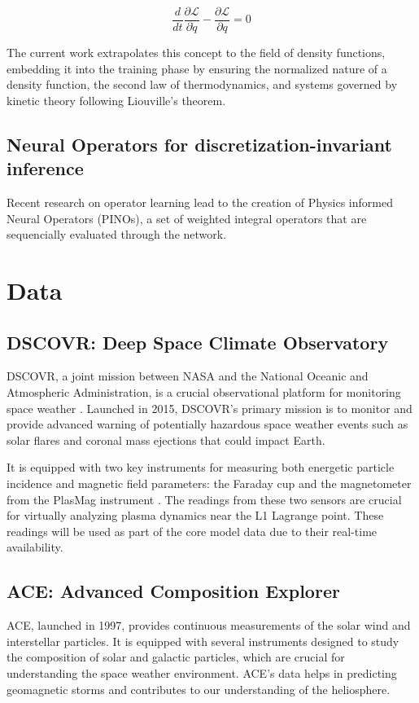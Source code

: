 \documentclass[12pt]{article}
\begin{document}
\begin{equation}
    \frac{d}{dt} \frac{\partial \mathcal{L}}{\partial \dot q} - \frac{\partial \mathcal{L}}{\partial q} = 0
\end{equation}

The current work extrapolates this concept to the field of density functions, embedding it into the training phase by ensuring the normalized nature of a density function, the second law of thermodynamics, and systems governed by kinetic theory following Liouville's theorem.

\subsection{Neural Operators for discretization-invariant inference}

Recent research on operator learning lead to the creation of Physics informed Neural Operators (PINOs), a set of weighted integral operators that are sequencially evaluated through the network.

\section{Data}

\subsection{DSCOVR: Deep Space Climate Observatory}
DSCOVR, a joint mission between NASA and the National Oceanic and Atmospheric Administration, is a crucial observational platform for monitoring space weather \cite{nasa_dscovr}. Launched in 2015, DSCOVR's primary mission is to monitor and provide advanced warning of potentially hazardous space weather events such as solar flares and coronal mass ejections that could impact Earth.

It is equipped with two key instruments for measuring both energetic particle incidence and magnetic field parameters: the Faraday cup and the magnetometer from the PlasMag instrument \cite{nasa_dscovr}. The readings from these two sensors are crucial for virtually analyzing plasma dynamics near the L1 Lagrange point. These readings will be used as part of the core model data due to their real-time availability.

\subsection{ACE: Advanced Composition Explorer}
ACE, launched in 1997, provides continuous measurements of the solar wind and interstellar particles. It is equipped with several instruments designed to study the composition of solar and galactic particles, which are crucial for understanding the space weather environment. ACE's data helps in predicting geomagnetic storms and contributes to our understanding of the heliosphere.
\end{document}
